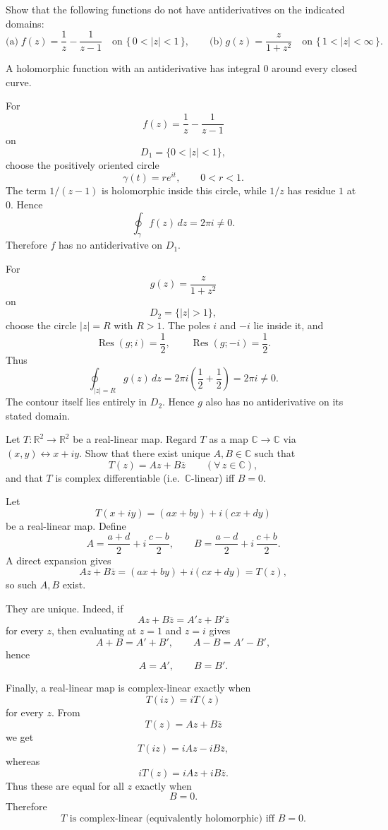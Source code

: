 \begin{problem}[CP-IV-0105]
\label{prob:cp-iv-0105}
Show that the following functions do not have antiderivatives on the indicated domains:
\[
\text{(a)}\; f(z)=\frac{1}{z}-\frac{1}{z-1}\quad\text{on } \{\,0<|z|<1\,\},\qquad
\text{(b)}\; g(z)=\frac{z}{1+z^{2}}\quad\text{on } \{\,1<|z|<\infty\,\}.
\]
\end{problem}

\begin{solution}
A holomorphic function with an antiderivative has integral \(0\) around every closed curve.

For
\[
f(z)=\frac1z-\frac1{z-1}
\]
on
\[
D_1=\{0<|z|<1\},
\]
choose the positively oriented circle
\[
\gamma(t)=re^{it},
\qquad 0<r<1.
\]
The term \(1/(z-1)\) is holomorphic inside this circle, while \(1/z\) has residue \(1\) at \(0\). Hence
\[
\oint_\gamma f(z)\,dz
=
2\pi i\neq0.
\]
Therefore \(f\) has no antiderivative on \(D_1\).

For
\[
g(z)=\frac{z}{1+z^2}
\]
on
\[
D_2=\{|z|>1\},
\]
choose the circle \(|z|=R\) with \(R>1\). The poles \(i\) and \(-i\) lie inside it, and
\[
\operatorname{Res}(g;i)
=
\frac12,
\qquad
\operatorname{Res}(g;-i)
=
\frac12.
\]
Thus
\[
\oint_{|z|=R}g(z)\,dz
=
2\pi i\left(\frac12+\frac12\right)
=
2\pi i\neq0.
\]
The contour itself lies entirely in \(D_2\). Hence \(g\) also has no antiderivative on its stated domain.
\end{solution}


\begin{problem}[CP-IV-0108]
\label{prob:cp-iv-0108}
Let $T:\mathbb{R}^2\to\mathbb{R}^2$ be a real-linear map. Regard $T$ as a map $\mathbb{C}\to\mathbb{C}$ via $(x,y)\leftrightarrow x+iy$.
	Show that there exist unique $A,B\in\mathbb{C}$ such that
	\[
	T(z)=Az+B\overline{z}\qquad(\forall\,z\in\mathbb{C}),
	\]
	and that $T$ is complex differentiable (i.e.\ $\mathbb{C}$-linear) iff $B=0$.
\end{problem}

\begin{solution}
Let
\[
T(x+iy)=(ax+by)+i(cx+dy)
\]
be a real-linear map. Define
\[
A=\frac{a+d}{2}+i\,\frac{c-b}{2},
\qquad
B=\frac{a-d}{2}+i\,\frac{c+b}{2}.
\]
A direct expansion gives
\[
Az+B\overline z
=
(ax+by)+i(cx+dy)
=
T(z),
\]
so such \(A,B\) exist.

They are unique. Indeed, if
\[
Az+B\overline z
=
A'z+B'\overline z
\]
for every \(z\), then evaluating at \(z=1\) and \(z=i\) gives
\[
A+B=A'+B',
\qquad
A-B=A'-B',
\]
hence
\[
A=A',
\qquad
B=B'.
\]

Finally, a real-linear map is complex-linear exactly when
\[
T(iz)=iT(z)
\]
for every \(z\). From
\[
T(z)=Az+B\overline z
\]
we get
\[
T(iz)=iAz-iB\overline z,
\]
whereas
\[
iT(z)=iAz+iB\overline z.
\]
Thus these are equal for all \(z\) exactly when
\[
B=0.
\]
Therefore
\[
\boxed{
T\text{ is complex-linear (equivalently holomorphic) iff }B=0.
}
\]
\end{solution}


